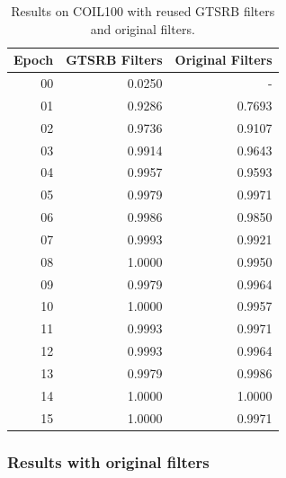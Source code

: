 \documentclass[11pt, a4paper]{article}
\begin{document}
\begin{table}[h!]
	\centering
	\begin{tabular}{|r|rr|}
		\hline
		Epoch & GTSRB Filters & Original Filters\\ \hline
		00 & 0.0250 & -\\
		01 & 0.9286 & 0.7693\\
		02 & 0.9736 & 0.9107\\
		03 & 0.9914 & 0.9643\\
		04 & 0.9957 & 0.9593\\
		05 & 0.9979 & 0.9971\\
		06 & 0.9986 & 0.9850\\
		07 & 0.9993 & 0.9921\\
		08 & 1.0000 & 0.9950\\
		09 & 0.9979 & 0.9964\\
		10 & 1.0000 & 0.9957\\
		11 & 0.9993 & 0.9971\\
		12 & 0.9993 & 0.9964\\
		13 & 0.9979 & 0.9986\\
		14 & 1.0000 & 1.0000\\
		15 & 1.0000 & 0.9971\\ \hline
	\end{tabular}

	\caption{Results on COIL100 with reused GTSRB filters and original filters.}
	\label{tab:coil-results}
\end{table}

\subsubsection{Results with original filters}
\end{document}
